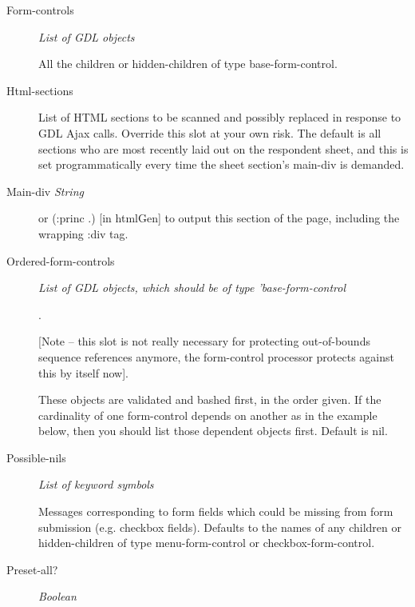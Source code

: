 \documentclass [11pt]{book}
\begin{document}
\begin{itemize}
\begin{description}
\item [Form-controls]
\emph{List of GDL objects}

 All the children or hidden-children
of type base-form-control.




\item [Html-sections]

List of HTML sections to be scanned and possibly replaced in response to
GDL Ajax calls. Override this slot at your own risk. The default is all
sections who are most recently laid out on the respondent sheet, and
this is set programmatically every time the sheet section's main-div
is demanded.




\item [Main-div%
\emph{String}

 This should be used with (str .) [in cl-who] or (:princ .)
[in htmlGen] to output this section of the page, including the wrapping :div tag.




\item [Ordered-form-controls]
\emph{List of GDL objects, which should be of type 'base-form-control}

.



[Note -- this slot is not really necessary for protecting out-of-bounds sequence references
anymore, the form-control processor protects against this by itself now].



These objects are validated and bashed first, in the order given. If the cardinality
of one form-control depends on another as in the example below, then you should list
those dependent objects first. Default is nil.




\item [Possible-nils]
\emph{List of keyword symbols}

 Messages corresponding to form fields which could
be missing from form submission (e.g. checkbox fields). Defaults to the names
of any children or hidden-children of type  menu-form-control or
checkbox-form-control.




\item [Preset-all?]
\emph{Boolean}


\end{description}
\end{itemize}
\end{document}
